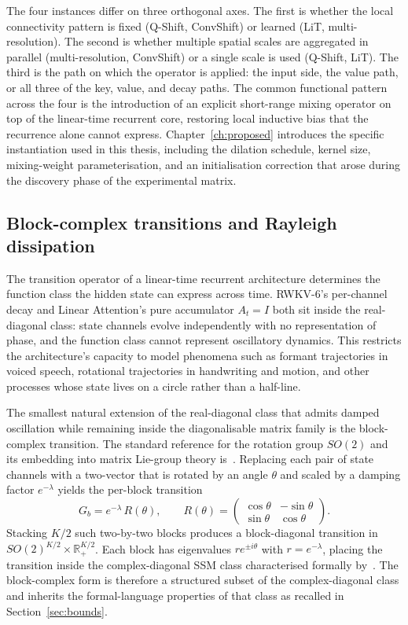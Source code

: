 The four instances differ on three orthogonal axes. The first is
whether the local connectivity pattern is fixed (Q-Shift, ConvShift)
or learned (LiT, multi-resolution). The second is whether multiple
spatial scales are aggregated in parallel (multi-resolution,
ConvShift) or a single scale is used (Q-Shift, LiT). The third is the
path on which the operator is applied: the input side, the value
path, or all three of the key, value, and decay paths. The common
functional pattern across the four is the introduction of an explicit
short-range mixing operator on top of the linear-time recurrent core,
restoring local inductive bias that the recurrence alone cannot
express. Chapter~\ref{ch:proposed} introduces the specific
instantiation used in this thesis, including the dilation schedule,
kernel size, mixing-weight parameterisation, and an initialisation
correction that arose during the discovery phase of the experimental
matrix.

\subsection{Block-complex transitions and Rayleigh dissipation}\label{sec:primitives:dho}

The transition operator of a linear-time recurrent architecture
determines the function class the hidden state can express across
time. RWKV-6's per-channel decay and Linear Attention's pure
accumulator $A_{t} = I$ both sit inside the real-diagonal class:
state channels evolve independently with no representation of
phase, and the function class cannot represent oscillatory
dynamics. This restricts the architecture's capacity to model
phenomena such as formant trajectories in voiced speech,
rotational trajectories in handwriting and motion, and other
processes whose state lives on a circle rather than a half-line.

The smallest natural extension of the real-diagonal class that
admits damped oscillation while remaining inside the
diagonalisable matrix family is the block-complex transition.
The standard reference for the rotation group $SO(2)$ and its
embedding into matrix Lie-group theory
is~\citet[Chapter 1]{hall2015lie}. Replacing each pair of state
channels with a two-vector that is rotated by an angle $\theta$
and scaled by a damping factor $e^{-\lambda}$ yields the
per-block transition
\begin{equation}\label{eq:block-complex}
G_{b} = e^{-\lambda} \, R(\theta), \qquad R(\theta) = \begin{pmatrix} \cos\theta & -\sin\theta \\ \sin\theta & \cos\theta \end{pmatrix}.
\end{equation}
Stacking $K/2$ such two-by-two blocks produces a block-diagonal
transition in $SO(2)^{K/2} \times \mathbb{R}_{+}^{K/2}$. Each
block has eigenvalues $r e^{\pm i \theta}$ with $r = e^{-\lambda}$,
placing the transition inside the complex-diagonal SSM class
characterised formally by~\citet{sarrof2024expressive}. The
block-complex form is therefore a structured subset of the
complex-diagonal class and inherits the formal-language
properties of that class as recalled in
Section~\ref{sec:bounds}.

